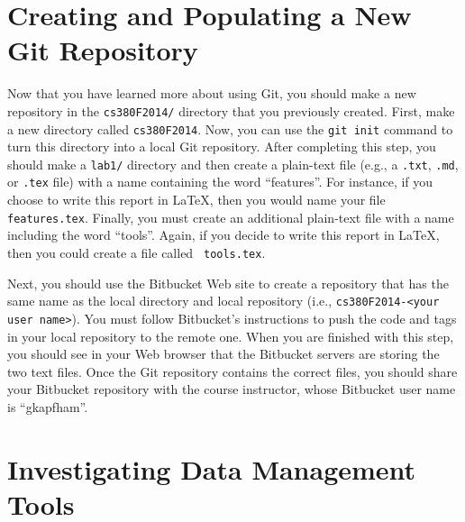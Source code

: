 \section*{Creating and Populating a New Git Repository}

Now that you have learned more about using Git, you should make a new repository in the {\tt cs380F2014/} directory that
you previously created.  First, make a new directory called {\tt cs380F2014}. Now, you can use the
{\tt git init} command to turn this directory into a local Git repository.  After completing this step, you should
make a {\tt lab1/} directory and then create a plain-text file (e.g., a {\tt .txt}, {\tt .md}, or {\tt .tex} file) with
a name containing the word ``features''.  For instance, if you choose to write this report in \LaTeX, then you would
name your file {\tt features.tex}. Finally, you must create an additional plain-text file with a name including the word
``tools''.  Again, if you decide to write this report in \LaTeX, then you could create a file called {\tt
  tools.tex}. 

Next, you should use the Bitbucket Web site to create a repository that has the same name as the local directory and
local repository (i.e., {\tt cs380F2014-<your user name>}).  You must follow Bitbucket's instructions to push the code
and tags in your local repository to the remote one. When you are finished with this step, you should see in your Web
browser that the Bitbucket servers are storing the two text files. Once the Git repository contains the correct files,
you should share your Bitbucket repository with the course instructor, whose Bitbucket user name is ``gkapfham''.


\section*{Investigating Data Management Tools}

